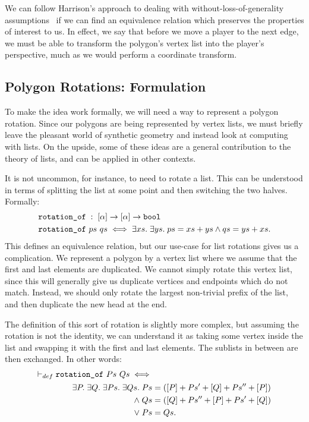 We can follow Harrison's approach to dealing with without-loss-of-generality assumptions~\cite{HarrisonWLOG} if we can find an equivalence relation which preserves the properties of interest to us. In effect, we say that before we move a player to the next edge, we must be able to transform the polygon's vertex list into the player's perspective, much as we would perform a coordinate transform.

\subsection{Polygon Rotations: Formulation}\label{sec:PolygonRotation}
To make the idea work formally, we will need a way to represent a polygon rotation. Since our polygons are being represented by vertex lists, we must briefly leave the pleasant world of synthetic geometry and instead look at computing with lists. On the upside, some of these ideas are a general contribution to the theory of lists, and can be applied in other contexts. 

It is not uncommon, for instance, to need to rotate a list. This can be understood in terms of splitting the list at some point and then switching the two halves. Formally:
\begin{displaymath}
  \begin{split}
&\texttt{rotation\_of}\; :\; [\alpha] \rightarrow [\alpha] \rightarrow \texttt{bool}\\
&\texttt{rotation\_of}\ ps\ qs \iff \exists xs.\;\exists ys.\; ps = xs + ys \wedge qs = ys + xs.\\
  \end{split}
\end{displaymath}
This defines an equivalence relation, but our use-case for list rotations gives us a complication. We represent a polygon by a vertex list where we assume that the first and last elements are duplicated. We cannot simply rotate this vertex list, since this will generally give us duplicate vertices and endpoints which do not match. Instead, we should only rotate the largest non-trivial prefix of the list, and then duplicate the new head at the end. 

The definition of this sort of rotation is slightly more complex, but assuming the rotation is not the identity, we can understand it as taking some vertex inside the list and swapping it with the first and last elements. The sublists in between are then exchanged. In other words:
\begin{align*}
    \vdash_{def}\;&\texttt{rotation\_of}\ Ps\ Qs \iff\\
    &\qquad\begin{aligned}
    \exists P.\;\exists Q.\;\exists Ps.\;\exists Qs.\; Ps &= ([P] + Ps' + [Q] + Ps'' + [P])\\
    \wedge\; Qs &= ([Q] + Ps'' + [P] + Ps' + [Q])\\
    \vee\; Ps &= Qs.
  \end{aligned}
\end{align*}

